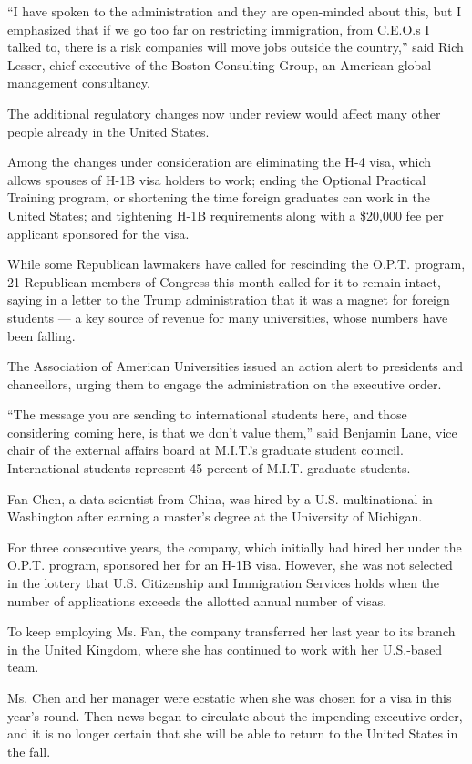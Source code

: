 ``I have spoken to the administration and they are open-minded about
this, but I emphasized that if we go too far on restricting immigration,
from C.E.O.s I talked to, there is a risk companies will move jobs
outside the country,'' said Rich Lesser, chief executive of the Boston
Consulting Group, an American global management consultancy.

The additional regulatory changes now under review would affect many
other people already in the United States.

Among the changes under consideration are eliminating the H-4 visa,
which allows spouses of H-1B visa holders to work; ending the Optional
Practical Training program, or shortening the time foreign graduates can
work in the United States; and tightening H-1B requirements along with a
\$20,000 fee per applicant sponsored for the visa.

While some Republican lawmakers have called for rescinding the O.P.T.
program, 21 Republican members of Congress this month called for it to
remain intact, saying in a letter to the Trump administration that it
was a magnet for foreign students --- a key source of revenue for many
universities, whose numbers have been falling.

The Association of American Universities issued an action alert to
presidents and chancellors, urging them to engage the administration on
the executive order.

``The message you are sending to international students here, and those
considering coming here, is that we don't value them,'' said Benjamin
Lane, vice chair of the external affairs board at M.I.T.'s graduate
student council. International students represent 45 percent of M.I.T.
graduate students.

Fan Chen, a data scientist from China, was hired by a U.S. multinational
in Washington after earning a master's degree at the University of
Michigan.

For three consecutive years, the company, which initially had hired her
under the O.P.T. program, sponsored her for an H-1B visa. However, she
was not selected in the lottery that U.S. Citizenship and Immigration
Services holds when the number of applications exceeds the allotted
annual number of visas.

To keep employing Ms. Fan, the company transferred her last year to its
branch in the United Kingdom, where she has continued to work with her
U.S.-based team.

Ms. Chen and her manager were ecstatic when she was chosen for a visa in
this year's round. Then news began to circulate about the impending
executive order, and it is no longer certain that she will be able to
return to the United States in the fall.

